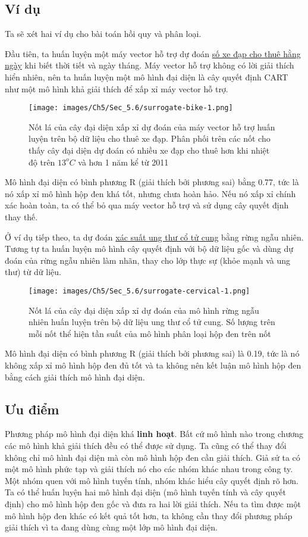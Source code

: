 \subsection{Ví dụ}
Ta sẽ xét hai ví dụ cho bài toán hồi quy và phân loại.

Đầu tiên, ta huấn luyện một máy vector hỗ trợ dự đoán \href{chap_3.1}{số xe đạp cho thuê hằng ngày} khi biết thời tiết và ngày tháng. Máy vector hỗ trợ không có lời giải thích hiển nhiên, nên ta huấn luyện một mô hình đại diện là cây quyết định CART như một mô hình khả giải thích để xấp xỉ máy vector hỗ trợ.

\begin{figure*}[h!]
	\centering
	\texttt{[image: images/Ch5/Sec\_5.6/surrogate-bike-1.png]}
	\label{fig:5_31}
	\caption{Nốt lá của cây đại diện xấp xỉ dự đoán của máy vector hỗ trợ huấn luyện trên bộ dữ liệu cho thuê xe đạp. Phân phối trên các nốt cho thấy cây đại diện dự đoán có nhiều xe đạp cho thuê hơn khi nhiệt độ trên $13^oC$ và hơn 1 năm kể từ 2011}
\end{figure*}

Mô hình đại diện có bình phương R (giải thích bởi phương sai) bằng 0.77, tức là nó xấp xỉ mô hình hộp đen khá tốt, nhưng chưa hoàn hảo. Nếu nó xấp xỉ chính xác hoàn toàn, ta có thể bỏ qua máy vector hỗ trợ và sử dụng cây quyết định thay thế.

Ở ví dụ tiếp theo, ta dự đoán \href{chap_3.3}{xác suất ung thư cổ tử cung} bằng rừng ngẫu nhiên. Tương tự ta huấn luyện mô hình cây quyết định với bộ dữ liệu gốc và dùng dự đoán của rừng ngẫu nhiên làm nhãn, thay cho lớp thực sự (khỏe mạnh và ung thư) từ dữ liệu.

\begin{figure*}[h!]
	\centering
	\texttt{[image: images/Ch5/Sec\_5.6/surrogate-cervical-1.png]}
	\label{fig:5_32}
	\caption{Nốt lá của cây đại diện xấp xỉ dự đoán của mô hình rừng ngẫu nhiên huấn luyện trên bộ dữ liệu ung thư cổ tử cung. Số lượng trên mỗi nốt thể hiện tần suất của mô hình phân loại hộp đen trên nốt}
\end{figure*}

Mô hình đại diện có bình phương R (giải thích bởi phương sai) là 0.19, tức là nó không xấp xỉ mô hình hộp đen đủ tốt và ta không nên kết luận mô hình hộp đen bằng cách giải thích mô hình đại diện.

\subsection{Ưu điểm}
Phương pháp mô hình đại diện khá \textbf{linh hoạt}. Bất cứ mô hình nào trong chương các mô hình khả giải thích đều có thể được sử dụng. Ta cũng có thể thay đổi không chỉ mô hình đại diện mà còn mô hình hộp đen cần giải thích. Giả sử ta có một mô hình phức tạp và giải thích nó cho các nhóm khác nhau trong công ty. Một nhóm quen với mô hình tuyến tính, nhóm khác hiểu cây quyết định rõ hơn. Ta có thể huấn luyện hai mô hình đại diện (mô hình tuyến tính và cây quyết định) cho mô hình hộp đen gốc và đưa ra hai lời giải thích. Nếu ta tìm được một mô hình hộp đen khác có kết quả tốt hơn, ta không cần thay đổi phương pháp giải thích vì ta đang dùng cùng một lớp mô hình đại diện.

